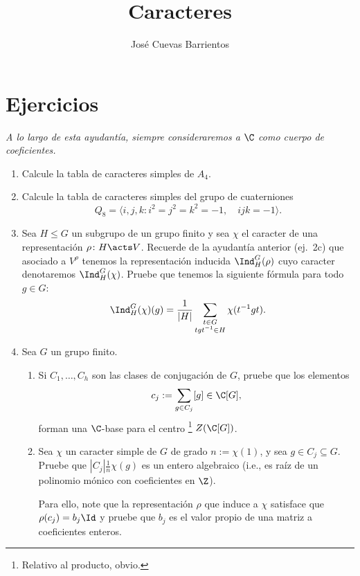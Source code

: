 \documentclass[11pt, reqno]{amsart}
\title{Caracteres}
\date{\DTMdate{2025-10-01}}
\author{José Cuevas Barrientos}
\begin{document}
\maketitle

\section{Ejercicios}
\begin{center}
	\slshape
	A lo largo de esta ayudantía, siempre consideraremos a $\C$ como cuerpo de coeficientes.
\end{center}
\begin{enumerate}
	\item Calcule la tabla de caracteres simples de $A_4$.

		\newex
	\item Calcule la tabla de caracteres simples del grupo de cuaterniones
		\[
			Q_8 = \langle i, j, k : i^2 = j^2 = k^2 = -1, \quad ijk = -1 \rangle.
		\]

		\newex
	\item Sea $H \le G$ un subgrupo de un grupo finito y sea $\chi$ el caracter de una representación $\rho \colon H \acts V$.
		Recuerde de la ayudantía anterior (ej.~2c) que asociado a $V^\rho$ tenemos la representación inducida $\Ind^G_H(\rho)$ cuyo
		caracter denotaremos $\Ind^G_H(\chi)$.
		Pruebe que tenemos la siguiente fórmula para todo $g \in G$:
		\[
			\Ind_H^G(\chi)(g) = \frac{1}{|H|} \sum_{\substack{t\in G \\ tgt^{-1} \in H}} \chi(t^{-1}gt).
		\]
		\nocite{serre:representations}

		\newex
	\item Sea $G$ un grupo finito.
		\begin{enumerate}
			\item Si $C_1, \dots, C_h$ son las clases de conjugación de $G$, pruebe que los elementos
				\[
					c_j := \sum_{g\in C_j} [g] \in \C[G],
				\]
				forman una $\C$-base para el centro%
				\footnote{Relativo al producto, obvio.}
				$Z(\C[G])$.

			\item\lookst
				Sea $\chi$ un caracter simple de $G$ de grado $n := \chi(1)$, y sea $g \in C_j \subseteq G$.
				Pruebe que $|C_j| \frac{1}{n} \chi(g)$ es un entero algebraico (i.e., es raíz de un polinomio mónico con coeficientes en $\Z$).
				\begin{hint}
					Para ello, note que la representación $\rho$ que induce a $\chi$ satisface que $\rho(c_j) = b_j\Id$
					y pruebe que $b_j$ es el valor propio de una matriz a coeficientes enteros.
				\end{hint}


\end{enumerate}
\end{enumerate}
\end{document}
